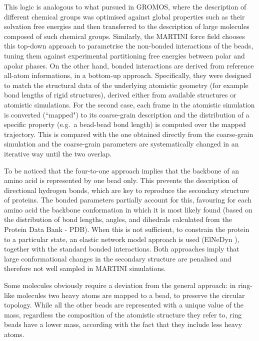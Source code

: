 This logic is analogous to what pursued in GROMOS, where the description of different chemical groups was optimised against global properties such as their solvation free energies and then transferred to the description of large molecules composed of such chemical groups.
%
Similarly, the MARTINI force field chooses this top-down approach to parametrise the non-bonded interactions of the beads, tuning them against experimental partitioning free energies between polar and apolar phases. On the other hand, bonded interactions are derived from reference all-atom informations, in a bottom-up approach.
%
Specifically, they were designed to match the structural data of the underlying atomistic geometry (for example bond lengths of rigid structures), derived either from available structures or atomistic simulations. For the second case, each frame in the atomistic simulation is converted (``mapped") to its coarse-grain description and the distribution of a specific property (e.g.\ a bead-bead bond length) is computed over the mapped trajectory. This is compared with the one obtained directly from the coarse-grain simulation and the coarse-grain parameters are systematically changed in an iterative way until the two overlap.

To be noticed that the four-to-one approach implies that the backbone of an amino acid is represented by one bead only. This prevents the description of directional hydrogen bonds, which are key to reproduce the secondary structure of proteins. The bonded parameters partially account for this, favouring for each amino acid the backbone conformation in which it is most likely found (based on the distribution of bond lengths, angles, and dihedrals calculated from the Protein Data Bank - PDB). When this is not sufficient, to constrain the protein to a particular state, an elastic network model approach is used (ElNeDyn \cite{elnedyn}), together with the standard bonded interactions. Both approaches imply that large conformational changes in the secondary structure are penalised and therefore not well sampled in MARTINI simulations.

Some molecules obviously require a deviation from the general approach: in ring-like molecules two heavy atoms are mapped to a bead, to preserve the circular topology. While all the other beads are represented with a unique value of the mass, regardless the composition of the atomistic structure they refer to, ring beads have a lower mass, according with the fact that they include less heavy atoms.

